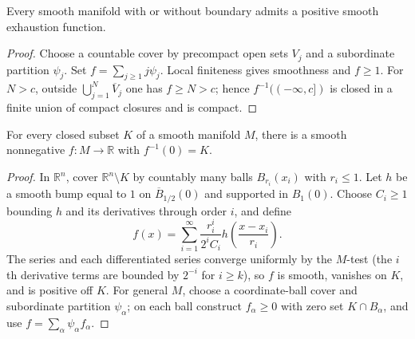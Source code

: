 \begin{proposition}
\label{prop:2-28}
\leanok
{}
Every smooth manifold with or without boundary admits a positive smooth exhaustion function.
\end{proposition}

\begin{proof}
\leanok
\sketch Choose a countable cover by precompact open sets $V_j$ and a subordinate partition $\psi_j$. Set $f=\sum_{j\geq1}j\psi_j$. Local finiteness gives smoothness and $f\geq1$. For $N>c$, outside $\bigcup_{j=1}^N\overline V_j$ one has $f\geq N>c$; hence $f^{-1}(( -\infty,c])$ is closed in a finite union of compact closures and is compact.
\end{proof}

\begin{theorem}
\label{thm:2-29}
\leanok
{}
For every closed subset $K$ of a smooth manifold $M$, there is a smooth nonnegative $f:M\to\mathbb R$ with $f^{-1}(0)=K$.
\end{theorem}

\begin{proof}
\leanok
\sketch In $\mathbb R^n$, cover $\mathbb R^n\setminus K$ by countably many balls $B_{r_i}(x_i)$ with $r_i\leq1$. Let $h$ be a smooth bump equal to $1$ on $\overline B_{1/2}(0)$ and supported in $B_1(0)$. Choose $C_i\geq1$ bounding $h$ and its derivatives through order $i$, and define
\[
f(x)=\sum_{i=1}^\infty\frac{r_i^i}{2^iC_i}h\!\left(\frac{x-x_i}{r_i}\right).
\]
The series and each differentiated series converge uniformly by the $M$-test (the $i$th derivative terms are bounded by $2^{-i}$ for $i\geq k$), so $f$ is smooth, vanishes on $K$, and is positive off $K$. For general $M$, choose a coordinate-ball cover and subordinate partition $\psi_\alpha$; on each ball construct $f_\alpha\geq0$ with zero set $K\cap B_\alpha$, and use $f=\sum_\alpha\psi_\alpha f_\alpha$.
\end{proof}
